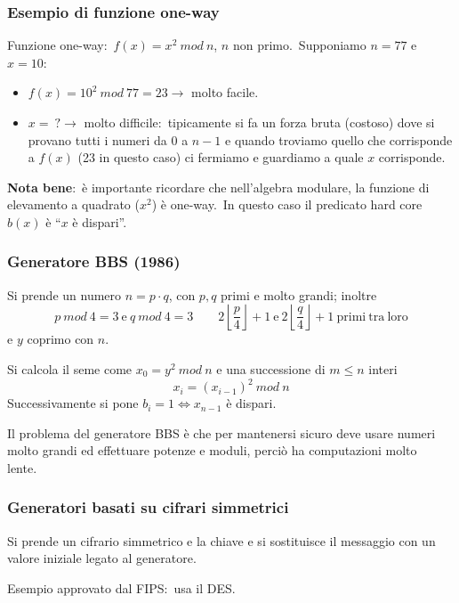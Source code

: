 \subsubsection{Esempio di funzione one-way}

Funzione one-way:\ $f(x) = x^2\ \mathit{mod}\ n$, $n$ non primo.\
Supponiamo $n = 77$ e $x = 10$:
\begin{itemize}
    \item  $f(x) = 10^2\ \mathit{mod}\ 77 = 23 \rightarrow$ molto facile.
    \item  $x =\ ? \rightarrow$ molto difficile:\ tipicamente si fa un forza bruta (costoso) dove si provano tutti i numeri da 0 a $n - 1$ e quando troviamo quello che corrisponde a $f(x)$ (23 in questo caso) ci fermiamo e guardiamo a quale $x$ corrisponde.
\end{itemize}
\textbf{Nota bene}:\ è importante ricordare che nell'algebra modulare, la funzione di elevamento a quadrato ($x^2$) è one-way.\
In questo caso il predicato hard core $b(x)$ è ``$x$ è dispari''.\

\subsubsection{Generatore BBS (1986)}

Si prende un numero $n = p \cdot q$, con $p,q$ primi e molto grandi; inoltre
\[p\ \mathit{mod}\ 4 = 3\ \mathrm{e}\ q\ \mathit{mod}\ 4 =3 \qquad 2 \left\lfloor\frac{p}{4}\right\rfloor + 1\ \mathrm{e}\ 2 \left\lfloor\frac{q}{4}\right\rfloor + 1\ \mathrm{primi\ tra\ loro} \]
e $y$ coprimo con $n$.\

Si calcola il seme come $x_0 = y^2\ \mathit{mod}\ n$ e una successione di $m \leq n$ interi
\[x_i = (x_{i-1})^2\ \mathit{mod}\ n\]
Successivamente si pone $b_i = 1 \Leftrightarrow x_{n-1}$ è dispari.\

Il problema del generatore BBS è che per mantenersi sicuro deve usare numeri molto grandi ed effettuare potenze e moduli, perciò ha computazioni molto lente.\

\subsubsection{Generatori basati su cifrari simmetrici}

Si prende un cifrario simmetrico e la chiave e si sostituisce il messaggio con un valore iniziale legato al generatore.\
\vspace{12pt}

\noindent Esempio approvato dal FIPS:\ usa il DES.\

